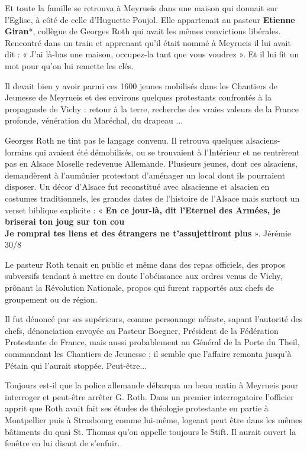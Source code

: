 
Et toute la famille se retrouva à Meyrueis dans une maison qui donnait sur l’Eglise, à côté de
celle d’Huguette Poujol. Elle appartenait au pasteur \textbf{Etienne Giran}*, collègue de Georges
Roth qui avait les mêmes convictions libérales. Rencontré dans un train et apprenant qu’il
était nommé à Meyrueis il lui avait dit :
« J’ai là-bas une maison, occupez-la tant que vous voudrez ». Et il lui fit un mot pour qu’on
lui remette les clés.

Il devait bien y avoir parmi ces 1600 jeunes mobilisés dans les Chantiers de Jeunesse de
Meyrueis et des environs quelques protestants confrontés à la propagande de Vichy : retour à
la terre, recherche des vraies valeurs de la France profonde, vénération du Maréchal, du
drapeau ...

Georges Roth ne tint pas le langage convenu.
Il retrouva quelques alsaciens-lorrains qui avaient été démobilisés, ou se trouvaient à
l’Intérieur et ne rentrèrent pas en Alsace Moselle redevenue Allemande. Plusieurs jeunes,
dont ces alsaciens, demandèrent à l’aumônier protestant d’aménager un local dont ils
pourraient disposer. Un décor d’Alsace fut reconstitué avec alsacienne et alsacien en costumes
traditionnels, les grandes dates de l’histoire de l’Alsace mais surtout un verset biblique
explicite : « \textbf{En ce jour-là, dit l’Eternel des Armées, je briserai ton joug sur ton cou}\\
\textbf{Je romprai tes liens et des étrangers ne t’assujettiront plus} ».
\hfill Jérémie 30/8

Le pasteur Roth tenait en public et même dans des repas officiels, des propos subversifs
tendant à mettre en doute l’obéissance aux ordres venus de Vichy, prônant la Révolution
Nationale, propos qui furent rapportés aux chefs de groupement ou de région.

Il fut dénoncé par ses supérieurs, comme personnage néfaste, sapant l’autorité des chefs,
dénonciation envoyée au Pasteur Boegner, Président de la Fédération Protestante de France,
mais aussi probablement au Général de la Porte du Theil, commandant les Chantiers de
Jeunesse ; il semble que l’affaire remonta jusqu’à Pétain qui l’aurait stoppée. Peut-être...

Toujours est-il que la police allemande débarqua un beau matin à Meyrueis pour interroger et
peut-être arrêter G. Roth. Dans un premier interrogatoire l’officier apprit que Roth avait fait
ses études de théologie protestante en partie à Montpellier puis à Strasbourg comme lui-même,
logeant peut être dans les mêmes bâtiments du quai St. Thomas qu’on appelle toujours le Stift.
Il aurait ouvert la fenêtre en lui disant de s’enfuir.


